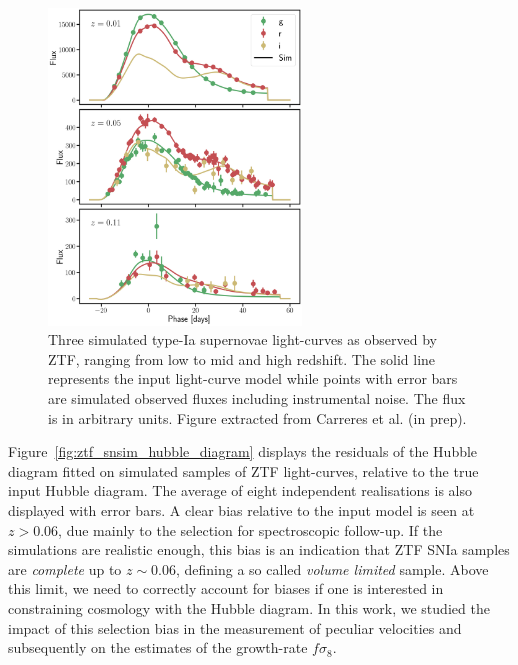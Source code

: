 \begin{figure}
    \centering
    \includegraphics[width=0.6\textwidth]{fig/velocities/snsim_lightcurves.png}
    \caption{Three simulated type-Ia supernovae light-curves as observed by ZTF, ranging from low to mid and high redshift. 
    The solid line represents the input light-curve model while points with error bars are simulated observed fluxes 
    including instrumental noise. The flux is in arbitrary units. Figure extracted from Carreres et al. (in prep). }
    \label{fig:ztf_snsim_lightcurves}
\end{figure}

Figure~\ref{fig:ztf_snsim_hubble_diagram} displays the residuals of the Hubble diagram 
fitted on simulated samples of ZTF light-curves, relative to the true input Hubble diagram. 
The average of eight independent realisations is also displayed with error bars. 
A clear bias relative to the input model is seen at $z > 0.06$, 
due mainly to the selection for spectroscopic follow-up. 
If the simulations are realistic enough, this bias is an indication that ZTF SNIa samples 
are \emph{complete} up to $z \sim 0.06$, defining a so called \emph{volume limited} sample. 
Above this limit, we need to correctly 
account for biases if one is interested in constraining cosmology with the Hubble diagram. 
In this work, we studied the impact of this selection bias in the measurement of peculiar 
velocities and subsequently on the estimates of the growth-rate $f\sigma_8$.  

